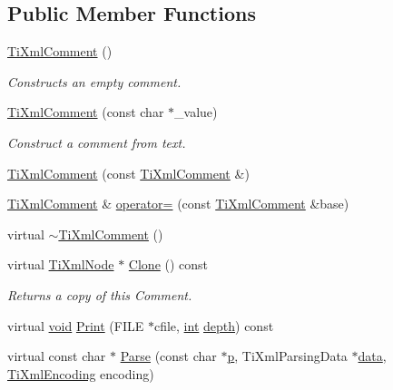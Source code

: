 \subsection*{Public Member Functions}
\begin{DoxyCompactItemize}
\item 
\hyperlink{class_ti_xml_comment_aaa3252031d3e8bd3a2bf51a1c61201b7}{Ti\-Xml\-Comment} ()
\begin{DoxyCompactList}\small\item\em Constructs an empty comment. \end{DoxyCompactList}\item 
\hyperlink{class_ti_xml_comment_a37e7802ef17bc03ebe5ae79bf0713d47}{Ti\-Xml\-Comment} (const char $\ast$\-\_\-value)
\begin{DoxyCompactList}\small\item\em Construct a comment from text. \end{DoxyCompactList}\item 
\hyperlink{class_ti_xml_comment_afaec41ac2760ce946ba1590eb5708e50}{Ti\-Xml\-Comment} (const \hyperlink{class_ti_xml_comment}{Ti\-Xml\-Comment} \&)
\item 
\hyperlink{class_ti_xml_comment}{Ti\-Xml\-Comment} \& \hyperlink{class_ti_xml_comment_a50888f168745972a1d773a4f5a87beb8}{operator=} (const \hyperlink{class_ti_xml_comment}{Ti\-Xml\-Comment} \&base)
\item 
virtual \hyperlink{class_ti_xml_comment_a3264ae2e9c4a127edfa03289bb2c9aa2}{$\sim$\-Ti\-Xml\-Comment} ()
\item 
virtual \hyperlink{class_ti_xml_node}{Ti\-Xml\-Node} $\ast$ \hyperlink{class_ti_xml_comment_a0d6662bdc52488b9e12b3c7a0453d028}{Clone} () const 
\begin{DoxyCompactList}\small\item\em Returns a copy of this Comment. \end{DoxyCompactList}\item 
virtual \hyperlink{wglew_8h_aeea6e3dfae3acf232096f57d2d57f084}{void} \hyperlink{class_ti_xml_comment_a6b316527aaa8da0370cd68c22a5a0f5f}{Print} (F\-I\-L\-E $\ast$cfile, \hyperlink{wglew_8h_a500a82aecba06f4550f6849b8099ca21}{int} \hyperlink{glew_8h_a1c814629538debe12a7bfe2509a3671e}{depth}) const 
\item 
virtual const char $\ast$ \hyperlink{class_ti_xml_comment_a11f1ee9d37a49c06f297c827d0f4e790}{Parse} (const char $\ast$\hyperlink{glew_8h_aa5367c14d90f462230c2611b81b41d23}{p}, Ti\-Xml\-Parsing\-Data $\ast$\hyperlink{fmod__codec_8h_a42c2b1d86fa71a425e73a882cb0a72c8}{data}, \hyperlink{tinyxml_8h_a88d51847a13ee0f4b4d320d03d2c4d96}{Ti\-Xml\-Encoding} encoding)

\end{DoxyCompactItemize}

